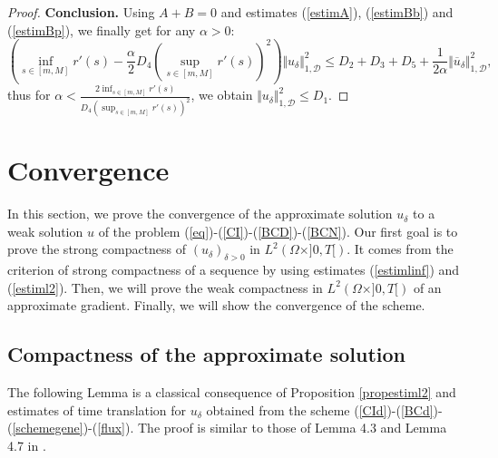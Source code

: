 \documentclass[smallextended]{svjour3}
\newcommand{\ds}{\displaystyle}
\begin{document}
\begin{proof}
\textbf{Conclusion.} Using $A+B=0$ and estimates (\ref{estimA}), (\ref{estimBb}) and (\ref{estimBp}), we finally get for any $\alpha>0$:
\begin{equation*}
\left(\inf_{s\in [m,M]}r'(s)-\frac{\alpha}{2}D_{4}\left(\sup_{s\in [m,M]}r'(s)\right)^{2}\right)\Vert u_{\delta}\Vert_{1,\mathcal{D}}^{2} \leq D_{2}+D_{3}+D_{5}+\frac{1}{2\alpha}\Vert \overline{u}_{\delta}\Vert_{1,\mathcal{D}}^{2},
\end{equation*}
thus for $\alpha < \ds{\frac{2\ds{\inf_{s\in [m,M]}r'(s)}}{D_{4}\left(\ds{\sup_{s\in [m,M]}r'(s)}\right)^{2}}}$, we obtain $
\Vert u_{\delta} \Vert_{1,\mathcal{D}}^{2} \leq D_{1}$.
\end{proof}




\section{Convergence}

In this section, we prove the convergence of the approximate solution $u_{\delta}$ to a weak solution $u$ of the problem (\ref{eq})-(\ref{CI})-(\ref{BCD})-(\ref{BCN}). Our first goal is to prove the strong compactness of $(u_{\delta})_{\delta>0}$ in $L^{2}\left(\Omega \times ]0,T[\right)$. It comes from the criterion of strong compactness of a sequence by using estimates (\ref{estimlinf}) and (\ref{estiml2}). Then, we will prove the weak compactness in $L^{2}(\Omega \times ]0,T[)$ of an approximate gradient. Finally, we will show the convergence of the scheme.


\subsection{Compactness of the approximate solution}

The following Lemma is a classical consequence of Proposition \ref{propestiml2} and estimates of time translation for $u_{\delta}$ obtained from the scheme (\ref{CId})-(\ref{BCd})-(\ref{schemegene})-(\ref{flux}). The proof is similar to those of Lemma 4.3 and Lemma 4.7 in \cite{Eymard2000}. 
\end{document}
